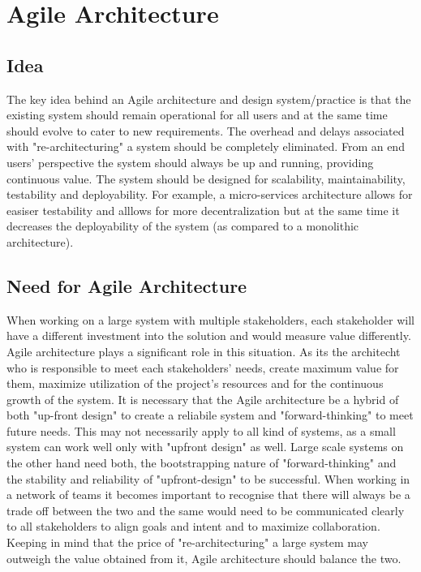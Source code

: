 \documentclass[sigplan,screen]{acmart}
\begin{document}
\section{Agile Architecture}
\subsection{Idea}
The key idea behind an Agile architecture and design system/practice is that the existing system should remain operational for all users and at the same time should evolve to cater to new requirements.
The overhead and delays associated with "re-architecturing" a system should be completely eliminated. From an end users' perspective the system should always be up and running, providing continuous value.
The system should be designed for scalability, maintainability, testability and deployability. For example, a micro-services architecture allows for easiser testability and alllows for more decentralization but at the same time it decreases the deployability of the system (as compared to a monolithic architecture).
\subsection{Need for Agile Architecture}
When working on a large system with multiple stakeholders, each stakeholder will have a different investment into the solution and would measure value differently.
Agile architecture plays a significant role in this situation. As its the architecht who is responsible to meet each stakeholders' needs, create maximum value for them, maximize utilization of the project's resources and for the continuous growth of the system\cite{b4}.
It is necessary that the Agile architecture be a hybrid of both "up-front design" to create a reliabile system and "forward-thinking" to meet future needs. This may not necessarily apply to all kind of systems, as a small system can work well only with "upfront design" as well.
Large scale systems on the other hand need both, the bootstrapping nature of "forward-thinking" and the stability and reliability of "upfront-design" to be successful. When working in a network of teams it becomes important to recognise that there will always be a trade off between the two and the same would need to be communicated clearly to all stakeholders to align goals and intent and to maximize collaboration\cite{b5}.
Keeping in mind that the price of "re-architecturing" a large system may outweigh the value obtained from it, Agile architecture should balance the two.
\end{document}
